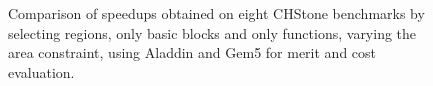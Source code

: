 \documentclass[]{usiinfthesis}
\begin{document}
\begin{figure}
{}
\caption{Comparison of speedups obtained on eight CHStone benchmarks
  by selecting regions, only basic blocks and only functions, varying
  the area constraint, using Aladdin and Gem5 for merit and cost evaluation. }
\label{fig:regions_aladdin}
\end{figure}

\end{document}
